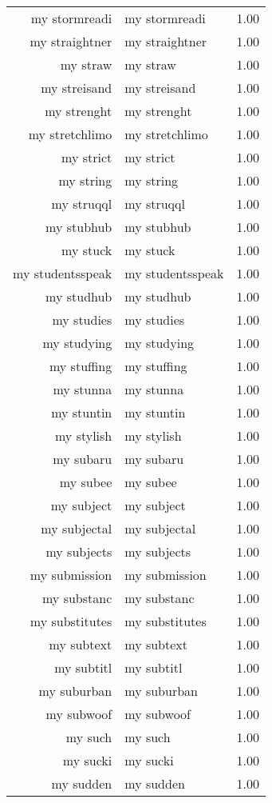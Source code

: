 \begin{table}[ht]
\begin{tabular}{rlr}
  my stormreadi & my stormreadi & 1.00 \\ 
  my straightner & my straightner & 1.00 \\ 
  my straw & my straw & 1.00 \\ 
  my streisand & my streisand & 1.00 \\ 
  my strenght & my strenght & 1.00 \\ 
  my stretchlimo & my stretchlimo & 1.00 \\ 
  my strict & my strict & 1.00 \\ 
  my string & my string & 1.00 \\ 
  my struqql & my struqql & 1.00 \\ 
  my stubhub & my stubhub & 1.00 \\ 
  my stuck & my stuck & 1.00 \\ 
  my studentsspeak & my studentsspeak & 1.00 \\ 
  my studhub & my studhub & 1.00 \\ 
  my studies & my studies & 1.00 \\ 
  my studying & my studying & 1.00 \\ 
  my stuffing & my stuffing & 1.00 \\ 
  my stunna & my stunna & 1.00 \\ 
  my stuntin & my stuntin & 1.00 \\ 
  my stylish & my stylish & 1.00 \\ 
  my subaru & my subaru & 1.00 \\ 
  my subee & my subee & 1.00 \\ 
  my subject & my subject & 1.00 \\ 
  my subjectal & my subjectal & 1.00 \\ 
  my subjects & my subjects & 1.00 \\ 
  my submission & my submission & 1.00 \\ 
  my substanc & my substanc & 1.00 \\ 
  my substitutes & my substitutes & 1.00 \\ 
  my subtext & my subtext & 1.00 \\ 
  my subtitl & my subtitl & 1.00 \\ 
  my suburban & my suburban & 1.00 \\ 
  my subwoof & my subwoof & 1.00 \\ 
  my such & my such & 1.00 \\ 
  my sucki & my sucki & 1.00 \\ 
  my sudden & my sudden & 1.00 \\ 

\end{tabular}
\end{table}
